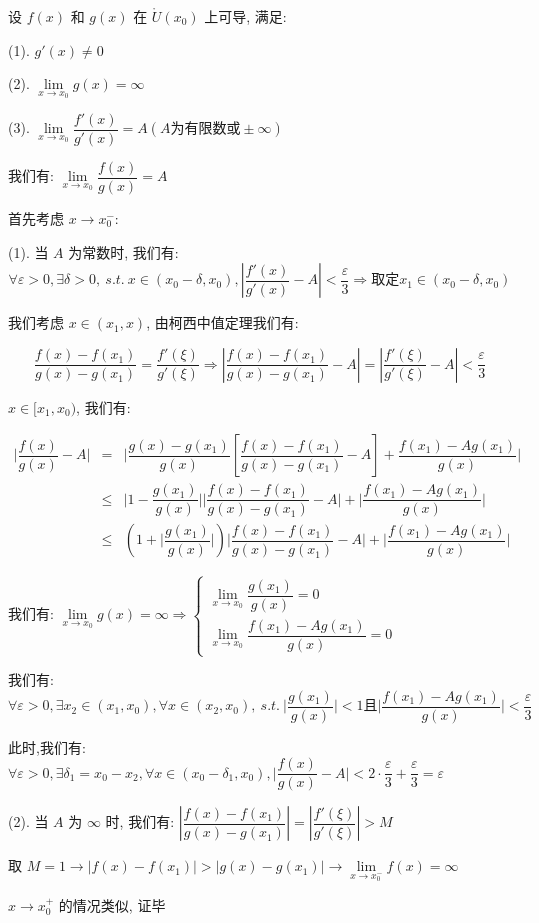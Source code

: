 \begin{theorem}[广义洛必达定理]
	设 $f(x)$ 和 $g(x)$ 在 $\mathring{U}(x_{0})$ 上可导, 满足:

	(1). $g'(x)\neq 0$

	(2). $\lim\limits_{x\to x_{0}}g(x) =\infty$

	(3). $\lim\limits_{x\to x_{0}}\dfrac{f'(x)}{g'(x)}=A(A\text{为有限数或}\pm\infty)$

	我们有: $\lim\limits_{x\to x_{0}}\dfrac{f(x)}{g(x)}=A$
\end{theorem}
\begin{anymark}[证明]
	首先考虑 $x\to x_{0}^{-}$:

	(1). 当 $A$ 为常数时, 我们有:
	$$\forall \varepsilon > 0, \exists \delta > 0,\ s.t.\ x\in (x_{0}-\delta,x_{0}), |\dfrac{f'(x)}{g'(x)}-A|<\dfrac{\varepsilon}{3}\Rightarrow \text{取定} x_{1}\in (x_{0}-\delta,x_{0})$$

	我们考虑 $x\in (x_{1},x)$, 由柯西中值定理我们有:

	$$\dfrac{f(x)-f(x_{1})}{g(x)-g(x_{1})} = \dfrac{f'(\xi)}{g'(\xi)}\Rightarrow |\dfrac{f(x)-f(x_{1})}{g(x)-g(x_{1})}-A| = |\dfrac{f'(\xi)}{g'(\xi)}-A| < \dfrac{\varepsilon}{3}$$

	$x\in[x_{1},x_{0})$, 我们有:

	\begin{eqnarray*}
		\big|\dfrac{f(x)}{g(x)} -A\big| &=& \big|\dfrac{g(x)-g(x_{1})}{g(x)} \left[\dfrac{f(x)-f(x_{1})}{g(x)-g(x_{1})}-A\right] + \dfrac{f(x_{1})-Ag(x_{1})}{g(x)}\big|\\
								&\leq& \big|1-\dfrac{g(x_{1})}{g(x)}\big|\big|\dfrac{f(x)-f(x_{1})}{g(x)-g(x_{1})}-A\big|+\big|\dfrac{f(x_{1})-Ag(x_{1})}{g(x)}\big|\\
								&\leq& (1+\big|\dfrac{g(x_{1})}{g(x)}\big|)\big|\dfrac{f(x)-f(x_{1})}{g(x)-g(x_{1})}-A\big|+\big|\dfrac{f(x_{1})-Ag(x_{1})}{g(x)}\big|
	\end{eqnarray*}

	我们有: $\lim\limits_{x\to x_{0}}g(x) =\infty\Rightarrow \begin{cases} \lim\limits_{x\to x_{0}}\dfrac{g(x_{1})}{g(x)} =0 \\ \lim\limits_{x\to x_{0}}\dfrac{f(x_{1})-Ag(x_{1})}{g(x)}=0\end{cases}$

	我们有:
	$$\forall \varepsilon >0, \exists x_{2}\in(x_{1},x_{0}),\forall x\in(x_{2},x_{0}),\ s.t.\ \big|\dfrac{g(x_{1})}{g(x)}\big|< 1 \text{且}
	 \big|\dfrac{f(x_{1})-Ag(x_{1})}{g(x)}\big|< \dfrac{\varepsilon}{3}$$

	此时,我们有: $\forall \varepsilon > 0, \exists \delta_{1} = x_{0}-x_{2}, \forall x\in (x_{0}-\delta_{1},x_{0}), \big|\dfrac{f(x)}{g(x)} -A\big|<2\cdot \dfrac{\varepsilon}{3}+\dfrac{\varepsilon}{3}=\varepsilon$
	
	(2). 当 $A$ 为 $\infty$ 时, 我们有: $|\dfrac{f(x)-f(x_{1})}{g(x)-g(x_{1})}| = |\dfrac{f'(\xi)}{g'(\xi)}| > M$
	
	取 $M = 1\to |f(x)-f(x_{1})|>|g(x)-g(x_{1})|\to \lim\limits_{x\to x_{0}^{-}}f(x) = \infty$

	$x\to x_{0}^{+}$ 的情况类似, 证毕
\end{anymark}


